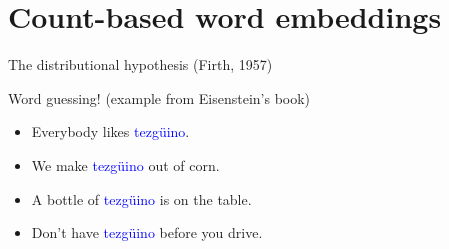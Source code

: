 \documentclass[usenames,dvipsnames,notes,11pt,aspectratio=169]{beamer}
\begin{document}
\section{Count-based word embeddings}

\begin{frame}
    {The distributional hypothesis}
     (Firth, 1957)
    \pause

    Word guessing! (example from Eisenstein's book)\\
    \begin{itemize}[<+->]
        \item[] Everybody likes \textcolor{blue}{tezg\"uino}.
        \item[] We make \textcolor{blue}{tezg\"uino} out of corn.
        \item[] A bottle of \textcolor{blue}{tezg\"uino} is on the table.
        \item[] Don't have \textcolor{blue}{tezg\"uino} before you drive.
    \end{itemize}

\end{frame}
\end{document}
